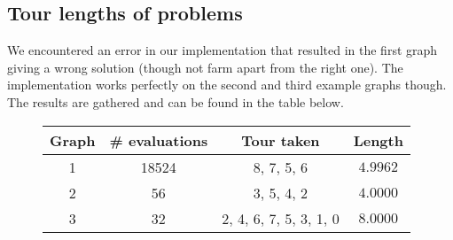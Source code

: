 \subsection{Tour lengths of problems}

We encountered an error in our implementation that resulted in the first
graph giving a wrong solution (though not farm apart from the right one). The
implementation works perfectly on the second and third example graphs though.
The results are gathered and can be found in the table below.

\begin{figure}[H]
  \centering
  \begin{tabular}{|c|c|c|c|}
    \hline
    \textbf{Graph} & \textbf{\# evaluations} & \textbf{Tour taken} & \textbf{Length}\\
    \hline
    1 & 18524 & 8, 7, 5, 6 & $4.9962$ \\
    \hline
    2 & 56    & 3, 5, 4, 2 & $4.0000$ \\
    \hline
    3 & 32    & 2, 4, 6, 7, 5, 3, 1, 0 & $8.0000$ \\
    \hline
  \end{tabular}
\end{figure}
